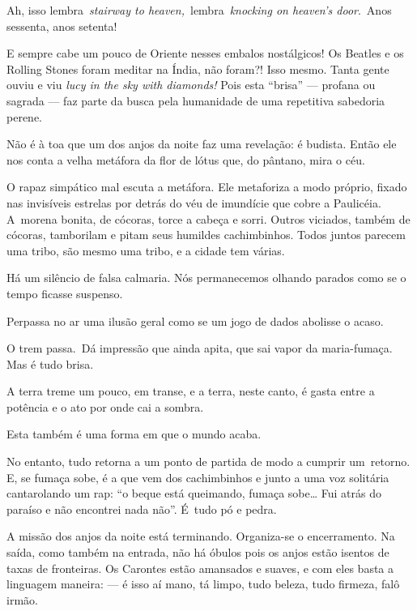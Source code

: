 Ah, isso lembra~\emph{stairway to heaven,}~lembra~\emph{knocking on
heaven's door}.~Anos sessenta, anos setenta!

E sempre cabe um pouco de Oriente nesses embalos nostálgicos! Os Beatles
e os Rolling Stones foram meditar na Índia, não foram?! Isso mesmo.
Tanta gente ouviu e viu \emph{lucy in the sky with diamonds!} Pois esta
``brisa'' --- profana ou sagrada --- faz parte da busca pela humanidade
de uma repetitiva sabedoria perene.

Não é à toa que um dos anjos da noite faz uma revelação: é budista.
Então ele nos conta a velha metáfora da flor de lótus que, do pântano,
mira o céu.

O rapaz simpático mal escuta a metáfora. Ele metaforiza a modo próprio,
fixado nas invisíveis estrelas por detrás do véu de imundície que cobre
a Paulicéia. A~morena bonita, de cócoras, torce a cabeça e sorri. Outros
viciados, também de cócoras, tamborilam e pitam seus humildes
cachimbinhos. Todos juntos parecem uma tribo, são mesmo uma tribo, e a
cidade tem várias.

 

Há um silêncio de falsa calmaria. Nós permanecemos olhando parados como
se o tempo ficasse suspenso.

 

Perpassa no ar uma ilusão geral como se um jogo de dados abolisse o
acaso.

 

O trem passa.~Dá impressão que ainda apita, que sai vapor da
maria-fumaça. Mas é tudo brisa.

 

A terra treme um pouco, em transe, e a terra, neste canto, é gasta entre
a potência e o ato por onde cai a sombra.

 

Esta também é uma forma em que o mundo acaba.

 

No entanto, tudo retorna a um ponto de partida de modo a cumprir
um~retorno. E, se fumaça sobe, é a que vem dos cachimbinhos e junto a
uma voz solitária cantarolando um rap: ``o beque está queimando, fumaça
sobe… Fui atrás do paraíso e não encontrei nada não''. É~tudo pó e
pedra.

 

A missão dos anjos da noite está terminando. Organiza-se o encerramento.
Na saída, como também na entrada, não há óbulos pois os anjos estão
isentos de taxas de fronteiras. Os Carontes estão amansados e suaves, e
com eles basta a linguagem maneira: --- é isso aí mano, tá limpo, tudo
beleza, tudo firmeza, falô irmão.


